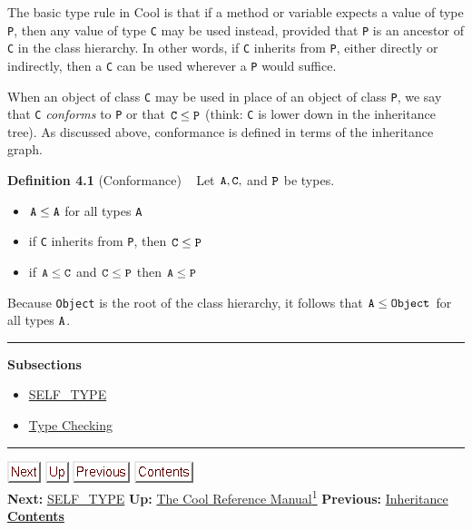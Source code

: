 \documentclass[]{article}
\begin{document}
The basic type rule in Cool is that if a method or variable expects a
value of type \texttt{P}, then any value of type \texttt{C} may be used
instead, provided that \texttt{P} is an ancestor of \texttt{C} in the
class hierarchy. In other words, if \texttt{C} inherits from \texttt{P},
either directly or indirectly, then a \texttt{C} can be used wherever a
\texttt{P} would suffice.

When an object of class \texttt{C} may be used in place of an object of
class \texttt{P}, we say that \texttt{C} \emph{conforms} to \texttt{P}
or that $\tt C \leq P$ (think: \texttt{C} is lower down in the
inheritance tree). As discussed above, conformance is defined in terms
of the inheritance graph.

\textbf{Definition 4.1} (Conformance) ~ Let $\tt A,C,$ and $\tt P$ be
types.

\begin{itemize}
\itemsep1pt\parskip0pt
\item
  $\tt A \leq A$ for all types \texttt{A}
\item
  if \texttt{C} inherits from \texttt{P}, then $\tt C \leq P$
\item
  if $\tt A \leq C$ and $\tt C \leq P$ then $\tt A \leq P$
\end{itemize}

Because \texttt{Object} is the root of the class hierarchy, it follows
that $\tt A \leq Object$ for all types $\tt A$.

\begin{center}\rule{3in}{0.4pt}\end{center}

\textbf{Subsections}

\begin{itemize}
\itemsep1pt\parskip0pt
\item
  \href{node8.html}{SELF\_TYPE}
\item
  \href{node9.html}{Type Checking}
\end{itemize}

\begin{center}\rule{3in}{0.4pt}\end{center}

\href{node8.html}{\includegraphics{next.png}}
\href{cool-manual.html}{\includegraphics{up.png}}
\href{node6.html}{\includegraphics{prev.png}}
\href{node1.html}{\includegraphics{contents.png}} \\ \textbf{Next:}
\href{node8.html}{SELF\_TYPE} \textbf{Up:} \href{cool-manual.html}{The
Cool Reference Manual\textsuperscript{1}} \textbf{Previous:}
\href{node6.html}{Inheritance} ~ \textbf{\href{node1.html}{Contents}}
\end{document}
